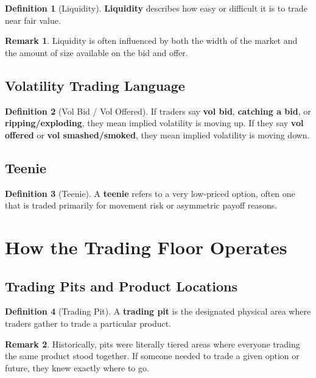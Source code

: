 \documentclass[11pt]{article}
\theoremstyle{definition}
\newtheorem{definition}{Definition}[section]
\newtheorem{remark}{Remark}[section]
\begin{document}
\begin{definition}[Liquidity]
\textbf{Liquidity} describes how easy or difficult it is to trade near fair value.
\end{definition}

\begin{remark}
Liquidity is often influenced by both the width of the market and the amount of size available on the bid and offer.
\end{remark}

\subsection{Volatility Trading Language}

\begin{definition}[Vol Bid / Vol Offered]
If traders say \textbf{vol bid}, \textbf{catching a bid}, or \textbf{ripping/exploding}, they mean implied volatility is moving up. If they say \textbf{vol offered} or \textbf{vol smashed/smoked}, they mean implied volatility is moving down.
\end{definition}

\subsection{Teenie}

\begin{definition}[Teenie]
A \textbf{teenie} refers to a very low-priced option, often one that is traded primarily for movement risk or asymmetric payoff reasons.
\end{definition}

\section{How the Trading Floor Operates}

\subsection{Trading Pits and Product Locations}

\begin{definition}[Trading Pit]
A \textbf{trading pit} is the designated physical area where traders gather to trade a particular product.
\end{definition}

\begin{remark}
Historically, pits were literally tiered areas where everyone trading the same product stood together. If someone needed to trade a given option or future, they knew exactly where to go.
\end{remark}
\end{document}
